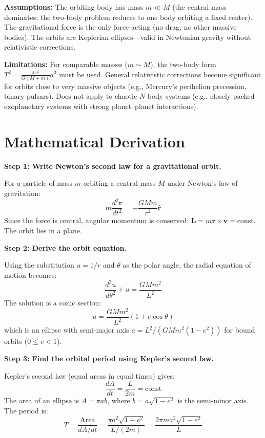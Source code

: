 \textbf{Assumptions:} The orbiting body has mass $m \ll M$ (the central mass dominates; the two-body problem reduces to one body orbiting a fixed center). The gravitational force is the only force acting (no drag, no other massive bodies). The orbits are Keplerian ellipses---valid in Newtonian gravity without relativistic corrections.


\textbf{Limitations:} For comparable masses ($m \sim M$), the two-body form $T^2 = \frac{4\pi^2}{G(M+m)}a^3$ must be used. General relativistic corrections become significant for orbits close to very massive objects (e.g., Mercury's perihelion precession, binary pulsars). Does not apply to chaotic $N$-body systems (e.g., closely packed exoplanetary systems with strong planet--planet interactions).


\section*{Mathematical Derivation}

\textbf{Step 1: Write Newton's second law for a gravitational orbit.}

For a particle of mass $m$ orbiting a central mass $M$ under Newton's law of gravitation:
\begin{equation}
m\frac{d^2\mathbf{r}}{dt^2} = -\frac{GMm}{r^2}\hat{\mathbf{r}}
\end{equation}
Since the force is central, angular momentum is conserved: $\mathbf{L} = m\mathbf{r}\times\mathbf{v} = \text{const}$. The orbit lies in a plane.

\textbf{Step 2: Derive the orbit equation.}

Using the substitution $u = 1/r$ and $\theta$ as the polar angle, the radial equation of motion becomes:
\begin{equation}
\frac{d^2u}{d\theta^2} + u = \frac{GMm^2}{L^2}
\end{equation}
The solution is a conic section:
\begin{equation}
u = \frac{GMm^2}{L^2}(1 + e\cos\theta)
\end{equation}
which is an ellipse with semi-major axis $a = L^2/(GMm^2(1-e^2))$ for bound orbits ($0 \leq e < 1$).

\textbf{Step 3: Find the orbital period using Kepler's second law.}

Kepler's second law (equal areas in equal times) gives:
\begin{equation}
\frac{dA}{dt} = \frac{L}{2m} = \text{const}
\end{equation}
The area of an ellipse is $A = \pi ab$, where $b = a\sqrt{1-e^2}$ is the semi-minor axis. The period is:
\begin{equation}
T = \frac{\text{Area}}{dA/dt} = \frac{\pi a^2\sqrt{1-e^2}}{L/(2m)} = \frac{2\pi m a^2\sqrt{1-e^2}}{L}
\end{equation}

